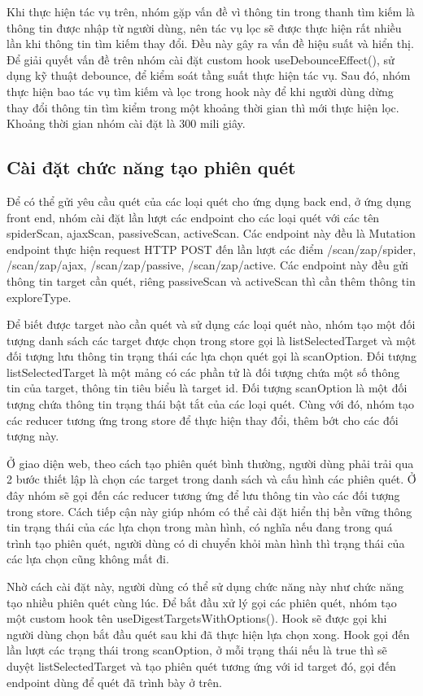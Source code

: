 Khi thực hiện tác vụ trên, nhóm gặp vấn đề vì thông tin trong thanh tìm kiếm là thông tin được nhập từ người dùng, nên tác vụ lọc sẽ được thực hiện rất nhiều lần khi thông tin tìm kiếm thay đổi. Đều này gây ra vấn đề hiệu suất và hiển thị. Để giải quyết vấn đề trên nhóm cài đặt custom hook useDebounceEffect(), sử dụng kỹ thuật debounce, để kiểm soát tầng suất thực hiện tác vụ. Sau đó, nhóm thực hiện bao tác vụ tìm kiếm và lọc trong hook này để khi người dùng dừng thay đổi thông tin tìm kiểm trong một khoảng thời gian thì mới thực hiện lọc. Khoảng thời gian nhóm cài đặt là 300 mili giây.

\subsection{Cài đặt chức năng tạo phiên quét}

\tab Để có thể gửi yêu cầu quét của các loại quét cho ứng dụng back end, ở ứng dụng front end, nhóm cài đặt lần lượt các endpoint cho các loại quét với các tên spiderScan, ajaxScan, passiveScan, activeScan. Các endpoint này đều là Mutation endpoint thực hiện request HTTP POST đến lần lượt các điểm /scan/zap/spider, /scan/zap/ajax, /scan/zap/passive, /scan/zap/active. Các endpoint này đều gửi thông tin target cần quét, riêng passiveScan và activeScan thì cần thêm thông tin exploreType.

Để biết được target nào cần quét và sử dụng các loại quét nào, nhóm tạo một đối tượng danh sách các target được chọn trong store gọi là listSelectedTarget và một đối tượng lưu thông tin trạng thái các lựa chọn quét gọi là scanOption. Đối tượng listSelectedTarget là một mảng có các phần tử là đối tượng chứa một số thông tin của target, thông tin tiêu biểu là target id. Đối tượng scanOption là một đối tượng chứa thông tin trạng thái bật tắt của các loại quét. Cùng với đó, nhóm tạo các reducer tương ứng trong store để thực hiện thay đổi, thêm bớt cho các đối tượng này.

Ở giao diện web, theo cách tạo phiên quét bình thường, người dùng phải trải qua 2 bước thiết lập là chọn các target trong danh sách và cấu hình các phiên quét.
Ở đây nhóm sẽ gọi đến các reducer tương ứng để lưu thông tin vào các đối tượng trong store. Cách tiếp cận này giúp nhóm có thể cài đặt hiển thị bền vững thông tin trạng thái của các lựa chọn trong màn hình, có nghĩa nếu đang trong quá trình tạo phiên quét, người dùng có di chuyển khỏi màn hình thì trạng thái của các lựa chọn cũng không mất đi.

Nhờ cách cài đặt này, người dùng có thể sử dụng chức năng này như chức năng tạo nhiều phiên quét cùng lúc.
Để bắt đầu xử lý gọi các phiên quét, nhóm tạo một custom hook tên useDigestTargetsWithOptions().
Hook sẽ được gọi khi người dùng chọn bắt đầu quét sau khi đã thực hiện lựa chọn xong.
Hook gọi đến lần lượt các trạng thái trong scanOption, ở mỗi trạng thái nếu là true thì sẽ duyệt listSelectedTarget và tạo phiên quét tương ứng với id target đó, gọi đến endpoint dùng để quét đã trình bày ở trên.

